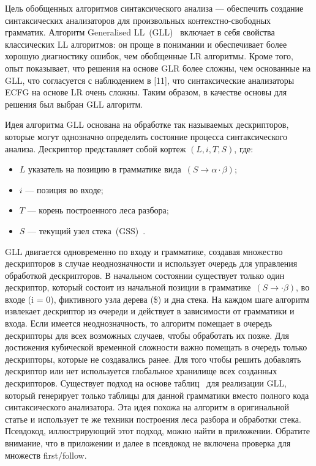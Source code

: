 \documentclass[14pt]{matmex-diploma-custom}
\begin{document}
	Цель обобщенных алгоритмов синтаксического анализа --- обеспечить создание синтаксических
	анализаторов для произвольных контекстно-свободных грамматик.
	Алгоритм Generalised LL~(GLL)~\cite{scott2010gll} включает в себя свойства классических LL алгоритмов:
	он проще в понимании и обеспечивает более хорошую диагностику ошибок, 
	чем обобщенные LR алгоритмы. Кроме того, опыт показывает, что решения на основе
	GLR более сложны, чем основанные на GLL, что согласуется с наблюдением в [11], что
	синтаксические анализаторы ECFG на основе LR очень сложны. Таким образом, в качестве
	основы для решения был выбран GLL алгоритм. 
	
	Идея алгоритма GLL основана на обработке так называемых дескрипторов, которые 
	могут однозначно определить состояние процесса синтаксического анализа. Дескриптор
	представляет собой кортеж $(L, i, T, S)$, где:
	\begin{itemize}
		\item $L$ указатель на позицию в грамматике вида~$(S \to \alpha \cdot \beta)$;
		\item $i$ --- позиция во входе;
		\item $T$ --- корень построенного леса разбора;
		\item $S$ --- текущий узел стека~(GSS)~\cite{afroozeh2015faster}.
	\end{itemize}
	
	GLL двигается одновременно по входу и грамматике, создавая множество дескрипторов
	в случае неоднозначности и использует очередь для управления обработкой дескрипторов.
	В начальном состоянии существует только один дескриптор, который состоит из начальной 
	позиции в грамматике~$(S \to \cdot \beta)$, во входе (i = 0), фиктивного узла дерева (\$)
	и дна стека. На каждом шаге алгоритм извлекает дескриптор из очереди и действует
	в зависимости от грамматики и входа. Если имеется неоднозначность, то алгоритм помещает
	в очередь дескрипторы для всех возможных случаев, чтобы обработать их позже. 
	Для достижения кубической временной сложности важно помещать в очередь только дескрипторы,
	которые не создавались ранее. Для того чтобы решить добавлять дескриптор или нет
	используется глобальное хранилище всех созданных дескрипторов.
	Существует подход на основе таблиц~\cite{ragozina} для реализации GLL, который генерирует
	только таблицы для данной грамматики вместо полного кода синтаксического анализатора.
	Эта идея похожа на алгоритм в оригинальной статье и использует те же техники
	построения леса разбора и обработки стека. Псевдокод, иллюстрирующий этот подход, 
	можно найти в приложении. Обратите внимание, что в приложении и далее в псевдокод не включена
	проверка для множеств first/follow.
    
\end{document}
